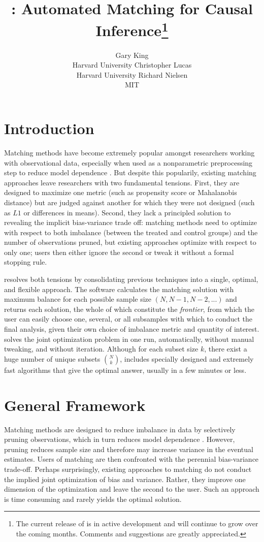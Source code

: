 \documentclass[nojss]{jss}
\author{Gary King\\Harvard University \And 
        Christopher Lucas\\Harvard University \And 
        Richard Nielsen\\MIT}
\title{\pkg{MatchingFrontier}: Automated Matching for Causal Inference\thanks{The current release of \pkg{MatchingFrontier} is in active development and will continue to grow over the coming months. Comments and suggestions are greatly appreciated.}}
\begin{document}

\section[Introduction]{Introduction}

Matching methods have become extremely popular amongst researchers
working with observational data, especially when used as a
nonparametric preprocessing step to reduce model dependence
\citep{ho2007,ho2009}. But despite this popularily, existing matching
approaches leave researchers with two fundamental tensions. First,
they are designed to maximize one metric (such as propensity score or
Mahalanobis distance) but are judged against another for which they
were not designed (such as $L1$ or differences in means). Second, they
lack a principled solution to revealing the implicit bias-variance
trade off: matching methods need to optimize with respect to both
imbalance (between the treated and control groups) and the number of
observations pruned, but existing approaches optimize with respect to
only one; users then either ignore the second or tweak it without a
formal stopping rule.

 resolves both tensions by consolidating
previous techniques into a single, optimal, and flexible approach. The
software calculates the matching solution with maximum balance for
each possible sample size $(N, N-1, N-2,...)$ and returns each
solution, the whole of which constitute the \emph{frontier}, from
which the user can easily choose one, several, or all subsamples with
which to conduct the final analysis, given their own choice of
imbalance metric and quantity of interest. 
solves the joint optimization problem in one run, automatically,
without manual tweaking, and without iteration.  Although for each
subset size $k$, there exist a huge number of unique subsets $N
\choose k$,  includes specially designed and
extremely fast algorithms that give the optimal answer, usually in a
few minutes or less.

\section[What MatchingFrontier Does]{General Framework}\label{sec:framework}

Matching methods are designed to reduce imbalance in data by
selectively pruning observations, which in turn reduces model
dependence \citep{king2006,imai2008,iacus2011a,ho2007}. However,
pruning reduces sample size and therefore may increase variance in the
eventual estimates. Users of matching are then confronted with the
perennial bias-variance trade-off. Perhaps surprisingly, existing
approaches to matching do not conduct the implied joint optimization
of bias and variance. Rather, they improve one dimension of the
optimization and leave the second to the user. Such an approach is
time consuming and rarely yields the optimal solution.
\end{document}
